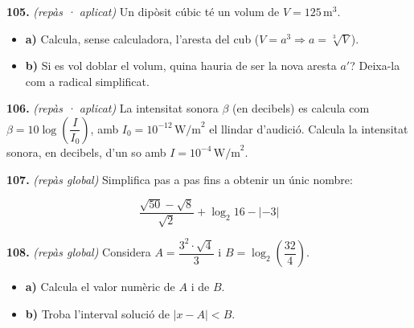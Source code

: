 \documentclass[13pt,a4paper]{extarticle}
\begin{document}
\par\noindent\begin{minipage}{\linewidth}
\textbf{105.} \emph{(repàs · aplicat)} Un dipòsit cúbic té un volum de $V=125\,\text{m}^3$.\par

\begin{itemize}[leftmargin=0pt,itemsep=3pt,topsep=3pt,parsep=0pt,label={}]
\item \textbf{a)} Calcula, sense calculadora, l'aresta del cub ($V=a^3 \Rightarrow a=\sqrt[3]{V}$).
\item \textbf{b)} Si es vol doblar el volum, quina hauria de ser la nova aresta $a'$? Deixa-la com a radical simplificat.
\end{itemize}
\end{minipage}\par\vspace{1.6mm}
\par\noindent\begin{minipage}{\linewidth}
\textbf{106.} \emph{(repàs · aplicat)} La intensitat sonora $\beta$ (en decibels) es calcula com $\beta=10\log\left(\dfrac{I}{I_0}\right)$, amb $I_0=10^{-12}\,\text{W/m}^2$ el llindar d'audició. Calcula la intensitat sonora, en decibels, d'un so amb $I=10^{-4}\,\text{W/m}^2$.\par
\end{minipage}\par\vspace{1.6mm}
\par\noindent\begin{minipage}{\linewidth}
\textbf{107.} \emph{(repàs global)} Simplifica pas a pas fins a obtenir un únic nombre:\par

$$\dfrac{\sqrt{50}-\sqrt{8}}{\sqrt2} + \log_2 16 - |{-3}|$$\par
\end{minipage}\par\vspace{1.6mm}
\par\noindent\begin{minipage}{\linewidth}
\textbf{108.} \emph{(repàs global)} Considera $A=\dfrac{3^2\cdot\sqrt4}{3}$ i $B=\log_2\left(\dfrac{32}{4}\right)$.\par

\begin{itemize}[leftmargin=0pt,itemsep=3pt,topsep=3pt,parsep=0pt,label={}]
\item \textbf{a)} Calcula el valor numèric de $A$ i de $B$.
\item \textbf{b)} Troba l'interval solució de $|x-A|<B$.
\end{itemize}
\end{minipage}\par\vspace{1.6mm}
\end{document}
